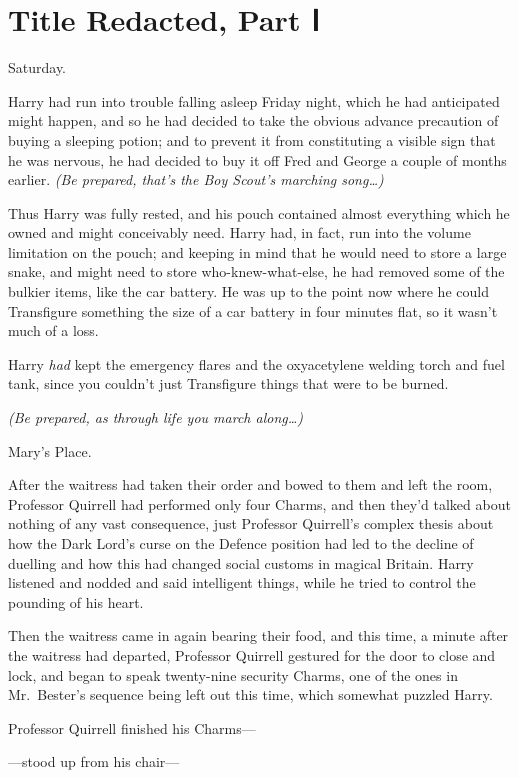 \chapter{Title Redacted, Part Ⅰ}

Saturday.

Harry had run into trouble falling asleep Friday night, which he had
anticipated might happen, and so he had decided to take the obvious
advance precaution of buying a sleeping potion; and to prevent it from
constituting a visible sign that he was nervous, he had decided to buy
it off Fred and George a couple of months earlier. \emph{(Be prepared,
that's the Boy Scout's marching song\ldots{})}

Thus Harry was fully rested, and his pouch contained almost everything
which he owned and might conceivably need. Harry had, in fact, run into
the volume limitation on the pouch; and keeping in mind that he would
need to store a large snake, and might need to store who-knew-what-else,
he had removed some of the bulkier items, like the car battery. He was
up to the point now where he could Transfigure something the size of a
car battery in four minutes flat, so it wasn't much of a loss.

Harry \emph{had} kept the emergency flares and the oxyacetylene welding
torch and fuel tank, since you couldn't just Transfigure things that
were to be burned.

\emph{(Be prepared, as through life you march along\ldots{})}

Mary's Place.

After the waitress had taken their order and bowed to them and left the
room, Professor Quirrell had performed only four Charms, and then they'd
talked about nothing of any vast consequence, just Professor Quirrell's
complex thesis about how the Dark Lord's curse on the Defence position
had led to the decline of duelling and how this had changed social
customs in magical Britain. Harry listened and nodded and said
intelligent things, while he tried to control the pounding of his heart.

Then the waitress came in again bearing their food, and this time, a
minute after the waitress had departed, Professor Quirrell gestured for
the door to close and lock, and began to speak twenty-nine security
Charms, one of the ones in Mr.~Bester's sequence being left out this
time, which somewhat puzzled Harry.

Professor Quirrell finished his Charms---

---stood up from his chair---

